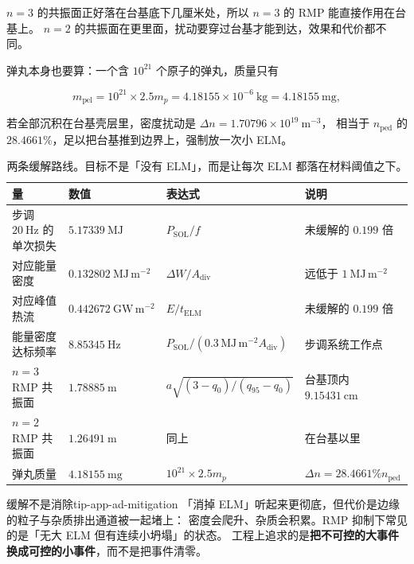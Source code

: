 $n=3$ 的共振面正好落在台基底下几厘米处，所以 $n=3$ 的 RMP 能直接作用在台基上。
$n=2$ 的共振面在更里面，扰动要穿过台基才能到达，效果和代价都不同。

弹丸本身也要算：一个含 $10^{21}$ 个原子的弹丸，质量只有

\begin{equation}
m_{\mathrm{pel}}=10^{21}\times2.5m_p=4.18155\times10^{-6}\ \mathrm{kg}=4.18155\ \mathrm{mg},
\label{eq:app-ad-pellet}
\end{equation}

若全部沉积在台基壳层里，密度扰动是 $\Delta n=1.70796\times10^{19}\ \mathrm{m^{-3}}$，
相当于 $n_{\mathrm{ped}}$ 的 $28.4661\%$，足以把台基推到边界上，强制放一次小 ELM。

\begin{table}[htbp]
\centering
\small
\caption{两条缓解路线。目标不是「没有 ELM」，而是让每次 ELM 都落在材料阈值之下。}
\label{tab:app-ad-mitigation}
\begin{tabular}{p{3.5cm}p{3.2cm}p{4.1cm}p{4.1cm}}
\toprule
量 & 数值 & 表达式 & 说明 \\
\midrule
步调 $20\ \mathrm{Hz}$ 的单次损失 & $5.17339\ \mathrm{MJ}$ & $P_{\mathrm{SOL}}/f$ & 未缓解的 $0.199$ 倍 \\
对应能量密度 & $0.132802\ \mathrm{MJ\,m^{-2}}$ & $\Delta W/A_{\mathrm{div}}$ & 远低于 $1\ \mathrm{MJ\,m^{-2}}$ \\
对应峰值热流 & $0.442672\ \mathrm{GW\,m^{-2}}$ & $E/t_{\mathrm{ELM}}$ & 未缓解的 $0.199$ 倍 \\
能量密度达标频率 & $8.85345\ \mathrm{Hz}$ & $P_{\mathrm{SOL}}/(0.3\,\mathrm{MJ\,m^{-2}}A_{\mathrm{div}})$ & 步调系统工作点 \\
$n=3$ RMP 共振面 & $1.78885\ \mathrm{m}$ & $a\sqrt{(3-q_0)/(q_{95}-q_0)}$ & 台基顶内 $9.15431\ \mathrm{cm}$ \\
$n=2$ RMP 共振面 & $1.26491\ \mathrm{m}$ & 同上 & 在台基以里 \\
弹丸质量 & $4.18155\ \mathrm{mg}$ & $10^{21}\times2.5m_p$ & $\Delta n=28.4661\%n_{\mathrm{ped}}$ \\
\bottomrule
\end{tabular}

\end{table}

\begin{tip}{缓解不是消除}{tip-app-ad-mitigation}
「消掉 ELM」听起来更彻底，但代价是边缘的粒子与杂质排出通道被一起堵上：
密度会爬升、杂质会积累。RMP 抑制下常见的是「无大 ELM 但有连续小坍塌」的状态。
工程上追求的是\textbf{把不可控的大事件换成可控的小事件}，而不是把事件清零。
\end{tip}

